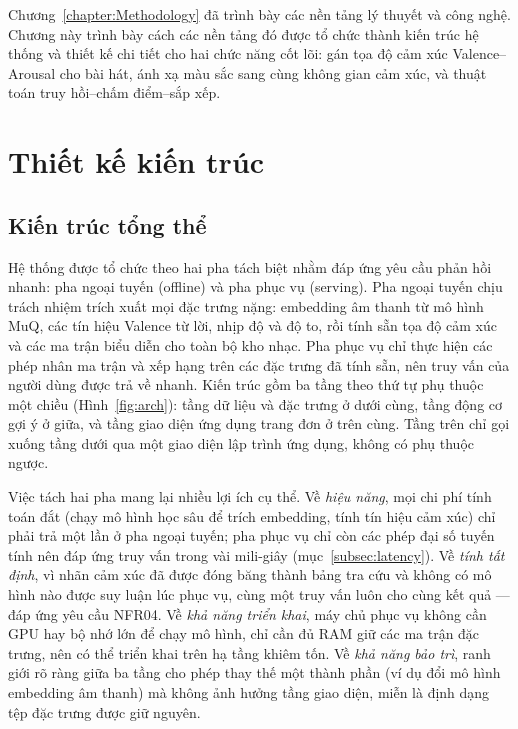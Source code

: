 \documentclass[../DoAn.tex]{subfiles}
\begin{document}
Chương~\ref{chapter:Methodology} đã trình bày các nền tảng lý thuyết và công nghệ. Chương này trình bày cách các nền tảng đó được tổ chức thành kiến trúc hệ thống và thiết kế chi tiết cho hai chức năng cốt lõi: gán tọa độ cảm xúc Valence--Arousal cho bài hát, ánh xạ màu sắc sang cùng không gian cảm xúc, và thuật toán truy hồi--chấm điểm--sắp xếp.

\section{Thiết kế kiến trúc}
\label{section:4.1}

\subsection{Kiến trúc tổng thể}
\label{subsection:4.1.1}
Hệ thống được tổ chức theo hai pha tách biệt nhằm đáp ứng yêu cầu phản hồi nhanh: pha ngoại tuyến (offline) và pha phục vụ (serving). Pha ngoại tuyến chịu trách nhiệm trích xuất mọi đặc trưng nặng: embedding âm thanh từ mô hình MuQ, các tín hiệu Valence từ lời, nhịp độ và độ to, rồi tính sẵn tọa độ cảm xúc và các ma trận biểu diễn cho toàn bộ kho nhạc. Pha phục vụ chỉ thực hiện các phép nhân ma trận và xếp hạng trên các đặc trưng đã tính sẵn, nên truy vấn của người dùng được trả về nhanh. Kiến trúc gồm ba tầng theo thứ tự phụ thuộc một chiều (Hình~\ref{fig:arch}): tầng dữ liệu và đặc trưng ở dưới cùng, tầng động cơ gợi ý ở giữa, và tầng giao diện ứng dụng trang đơn ở trên cùng. Tầng trên chỉ gọi xuống tầng dưới qua một giao diện lập trình ứng dụng, không có phụ thuộc ngược.

Việc tách hai pha mang lại nhiều lợi ích cụ thể. Về \textit{hiệu năng}, mọi chi phí tính toán đắt (chạy mô hình học sâu để trích embedding, tính tín hiệu cảm xúc) chỉ phải trả một lần ở pha ngoại tuyến; pha phục vụ chỉ còn các phép đại số tuyến tính nên đáp ứng truy vấn trong vài mili-giây (mục~\ref{subsec:latency}). Về \textit{tính tất định}, vì nhãn cảm xúc đã được đóng băng thành bảng tra cứu và không có mô hình nào được suy luận lúc phục vụ, cùng một truy vấn luôn cho cùng kết quả --- đáp ứng yêu cầu NFR04. Về \textit{khả năng triển khai}, máy chủ phục vụ không cần GPU hay bộ nhớ lớn để chạy mô hình, chỉ cần đủ RAM giữ các ma trận đặc trưng, nên có thể triển khai trên hạ tầng khiêm tốn. Về \textit{khả năng bảo trì}, ranh giới rõ ràng giữa ba tầng cho phép thay thế một thành phần (ví dụ đổi mô hình embedding âm thanh) mà không ảnh hưởng tầng giao diện, miễn là định dạng tệp đặc trưng được giữ nguyên.
\end{document}
